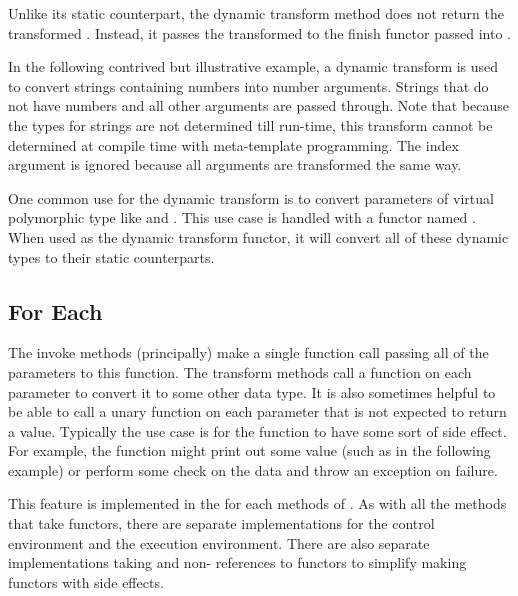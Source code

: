 Unlike its static counterpart, the dynamic transform method does not return
the transformed . Instead, it passes the
transformed  to the finish functor passed
into .

In the following contrived but illustrative example, a dynamic transform is
used to convert strings containing numbers into number arguments. Strings
that do not have numbers and all other arguments are passed through. Note
that because the types for strings are not determined till run-time, this
transform cannot be determined at compile time with meta-template
programming. The index argument is ignored because all arguments are
transformed the same way.



One common use for the  dynamic transform
is to convert parameters of virtual polymorphic type like
 and . This
use case is handled with a functor named
. When used as the dynamic transform
functor, it will convert all of these dynamic types to their static
counterparts.



\subsection{For Each}
\label{sec:FunctionInterface:ForEach}


The invoke methods (principally) make a single function call passing all of
the parameters to this function. The transform methods call a function on
each parameter to convert it to some other data type. It is also sometimes
helpful to be able to call a unary function on each parameter that is not
expected to return a value. Typically the use case is for the function to
have some sort of side effect. For example, the function might print out
some value (such as in the following example) or perform some check on the
data and throw an exception on failure.

This feature is implemented in the for each methods of
.  As with all the
 methods that take functors, there are
separate implementations for the control environment and the execution
environment. There are also separate implementations taking
 and non- references to functors to
simplify making functors with side effects.

